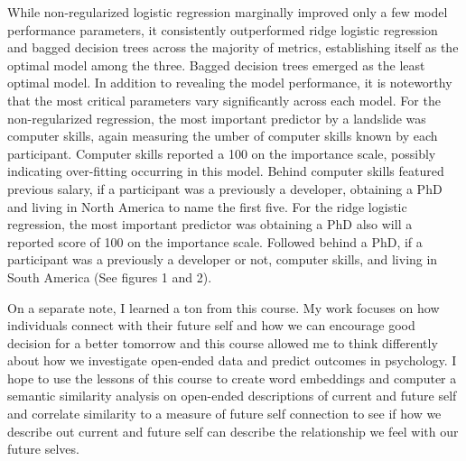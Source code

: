 \documentclass[
  man]{apa6}
\begin{document}
While non-regularized logistic regression marginally improved only a few model performance parameters, it consistently outperformed ridge logistic regression and bagged decision trees across the majority of metrics, establishing itself as the optimal model among the three. Bagged decision trees emerged as the least optimal model. In addition to revealing the model performance, it is noteworthy that the most critical parameters vary significantly across each model. For the non-regularized regression, the most important predictor by a landslide was computer skills, again measuring the umber of computer skills known by each participant. Computer skills reported a 100 on the importance scale, possibly indicating over-fitting occurring in this model. Behind computer skills featured previous salary, if a participant was a previously a developer, obtaining a PhD and living in North America to name the first five. For the ridge logistic regression, the most important predictor was obtaining a PhD also will a reported score of 100 on the importance scale. Followed behind a PhD, if a participant was a previously a developer or not, computer skills, and living in South America (See figures 1 and 2).

On a separate note, I learned a ton from this course. My work focuses on how individuals connect with their future self and how we can encourage good decision for a better tomorrow and this course allowed me to think differently about how we investigate open-ended data and predict outcomes in psychology. I hope to use the lessons of this course to create word embeddings and computer a semantic similarity analysis on open-ended descriptions of current and future self and correlate similarity to a measure of future self connection to see if how we describe out current and future self can describe the relationship we feel with our future selves.
\end{document}
